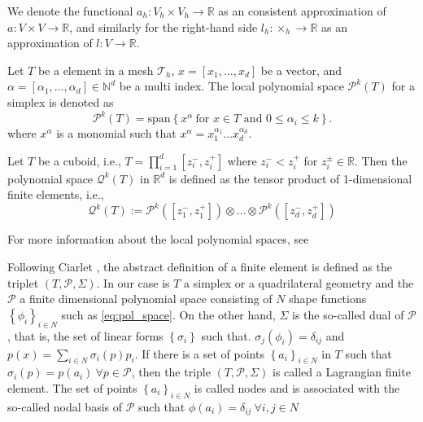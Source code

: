 We denote the functional $a_{h}: V_{h} \times V_{h} \to \mathbb{R} $ as an consistent approximation of $a: V \times V \to \mathbb{R} $, and similarly for the right-hand side $l_{h} : \times _{h} \to \mathbb{R} $ as an approximation of $l: V \to \mathbb{R} $.

\begin{definition}
    \label{def:local_space}
    Let $T$ be a element in a mesh $\mathcal{T}_{h} $,  $x = \left[ x_{1}, \ldots, x_{d} \right] $ be a vector, and $\alpha  = \left[ \alpha _{1}, \ldots, \alpha _{d} \right] \in \mathbb{N} ^{d} $ be a multi index.
    The local polynomial space $\mathcal{P} ^{k}( T) $ for a simplex is denoted as
    \begin{equation}
    \label{eq:pol_space}
        \mathcal{P}^{k}( T) =  \mathrm{span}\left\{ x^{\alpha } \ \text{for } x \in T \text{ and } 0 \le  \alpha _{i} \le k \right\}.
    \end{equation}
    where  $x^{\alpha }$ is a monomial such that $x^{\alpha } = x_{1}^{\alpha _{1}} \ldots x_{d}^{\alpha _{d}}$.

    Let $T$ be a cuboid, i.e.,  $T = \prod_{i=1}^{d} [z_{i}^{-},z_{i}^{+}]$ where $z_{i}^{-}< z_{i}^{+}$ for $z_{i}^{\pm} \in \mathbb{R} $. Then the polynomial space $\mathcal{Q}^{k}( T)$  in $\mathbb{R} ^{d}$ is defined as the tensor product of 1-dimensional
    finite elements, i.e.,
      \[
    \mathcal{Q} ^{k}(T)  := \mathcal{P}^{k}( [z_{1}^{-},z_{1}^{+}] ) \otimes \ldots \otimes \mathcal{P}^{k}( [z_{d}^{-},z_{d}^{+}] )
    \]
\end{definition}
For more information about the local polynomial spaces, see \cite[Chapter 6.4, 7.3]{ErnGuermond2021}

Following Ciarlet \cite[pp.93]{ciarlet1991basic}, the abstract definition of a finite element is defined as the triplet $( T, \mathcal{P}, \Sigma ) $. In our case is $T$ a simplex or a quadrilateral geometry and the $\mathcal{P} $ a finite dimensional polynomial space consisting of $N$ shape
functions $\left\{ \phi_{i}  \right\}_{i\in N} $ such as \eqref{eq:pol_space}.
On the other hand, $\Sigma $ is the so-called dual of $\mathcal{P}$, that is, the set of linear forms $\left\{ \sigma _{i} \right\} $ such that. $ \sigma_{j} ( \phi_{i} ) = \delta _{ij}$ and $p( x) = \sum_{i\in N}^{} \sigma_{i} ( p) p_{i} $.
If there is a set of points $\left\{ a_{i} \right\}_{i \in N} $  in $T$ such that
$\sigma_{i}( p) = p( a_{i}) \  \forall p \in \mathcal{P}$,  then the triple $( T, \mathcal{P}, \Sigma  ) $ is called a Lagrangian finite element. The set of points $\left\{ a_{i} \right\}_{i \in N}  $ is called nodes and is associated with the
so-called nodal basis of $\mathcal{P} $ such that  $\phi ( a_{i}) = \delta _{ij} \ \forall i,j  \in N$

